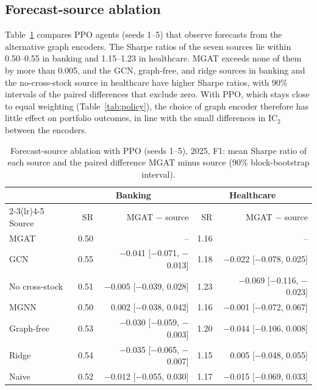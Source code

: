 \documentclass[pdflatex,sn-mathphys-num]{sn-jnl}%
\theoremstyle{thmstyleone}%
\theoremstyle{thmstyletwo}%
\theoremstyle{thmstylethree}%
\begin{document}
\subsection{Forecast-source ablation}\label{subsec:ablation}

{\color{blue}Table~\ref{tab:ablation_ppo} compares PPO agents (seeds 1--5) that observe forecasts from the alternative graph encoders. The Sharpe ratios of the seven sources lie within 0.50--0.55 in banking and 1.15--1.23 in healthcare. MGAT exceeds none of them by more than 0.005, and the GCN, graph-free, and ridge sources in banking and the no-cross-stock source in healthcare have higher Sharpe ratios, with 90\% intervals of the paired differences that exclude zero. With PPO, which stays close to equal weighting (Table~\ref{tab:policy}), the choice of graph encoder therefore has little effect on portfolio outcomes, in line with the small differences in IC$_2$ between the encoders.\par}

\begin{table}[!t]\centering\small\color{blue}
\caption{Forecast-source ablation with PPO (seeds 1--5), 2025, F1: mean Sharpe ratio of each source and the paired difference MGAT minus source (90\% block-bootstrap interval).}
\label{tab:ablation_ppo}
\setlength{\tabcolsep}{3pt}
\begin{tabular}{lrrrr}\toprule
 & \multicolumn{2}{c}{Banking} & \multicolumn{2}{c}{Healthcare} \\ \cmidrule(lr){2-3}\cmidrule(lr){4-5}
Source & SR & MGAT $-$ source & SR & MGAT $-$ source \\ \midrule
MGAT & 0.50 & -- & 1.16 & -- \\
GCN & 0.55 & $-$0.041 [$-$0.071, $-$0.013] & 1.18 & $-$0.022 [$-$0.078, 0.025] \\
No cross-stock & 0.51 & $-$0.005 [$-$0.039, 0.028] & 1.23 & $-$0.069 [$-$0.116, $-$0.023] \\
MGNN & 0.50 & 0.002 [$-$0.038, 0.042] & 1.16 & $-$0.001 [$-$0.072, 0.067] \\
Graph-free & 0.53 & $-$0.030 [$-$0.059, $-$0.003] & 1.20 & $-$0.044 [$-$0.106, 0.008] \\
Ridge & 0.54 & $-$0.035 [$-$0.065, $-$0.007] & 1.15 & 0.005 [$-$0.048, 0.055] \\
Naive & 0.52 & $-$0.012 [$-$0.055, 0.030] & 1.17 & $-$0.015 [$-$0.069, 0.033] \\
\bottomrule\end{tabular}
\end{table}
\end{document}
